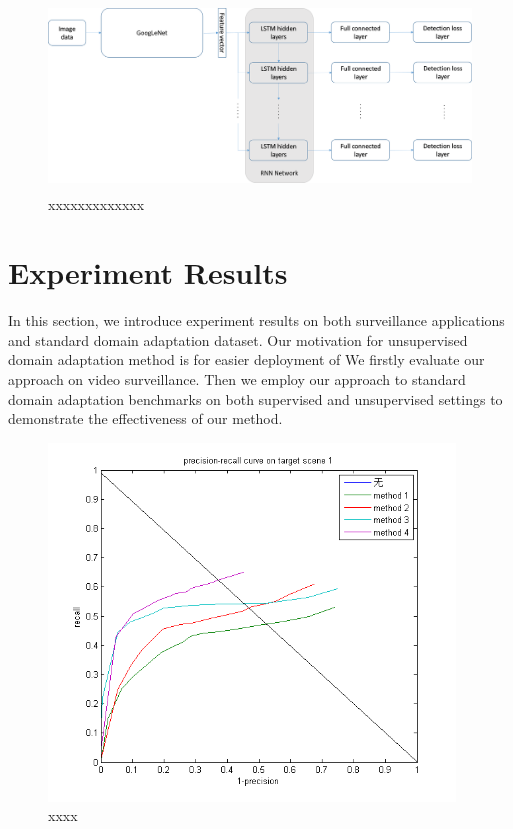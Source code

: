 \documentclass[runningheads]{llncs}
\begin{document}
\begin{figure}
\centering
\includegraphics[height=5cm]{images/reinspect.png}
\caption{xxxxxxxxxxxxx}
\label{fig:reinspect}
\end{figure}


\section{Experiment Results}
\label{section:Experiment Results}

In this section, we introduce experiment results on both surveillance applications and standard domain adaptation dataset. Our motivation for unsupervised domain adaptation method is for easier deployment of  We firstly evaluate our approach on video surveillance. Then we employ our approach to standard domain adaptation benchmarks on both supervised and unsupervised settings to demonstrate the effectiveness of our method.

\begin{figure}
\centering
\includegraphics[height=9.5cm]{images/precisionrecallcurve.png}
\caption{xxxx}
\label{fig:precisionrecallcurve}
\end{figure}
\end{document}

